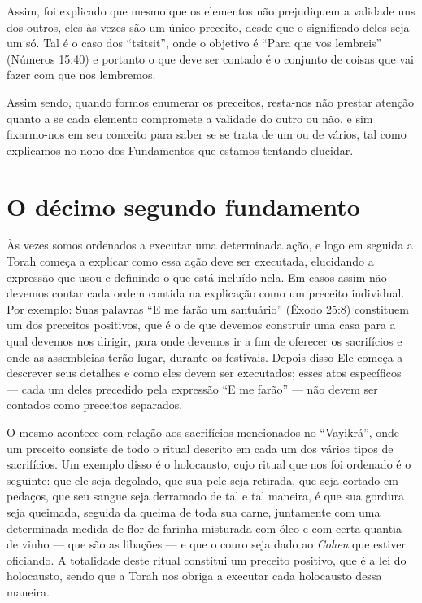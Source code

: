 Assim, foi explicado que mesmo que os elementos não prejudiquem a
validade uns dos outros, eles às vezes são um único preceito, desde que
o significado deles seja um só. Tal é o caso dos ``tsitsit'', onde o
objetivo é ``Para que vos lembreis'' (Números 15:40) e portanto o que
deve ser contado é o conjunto de coisas que vai fazer com que nos
lembremos.

Assim sendo, quando formos enumerar os preceitos, resta-nos não prestar
atenção quanto a se cada elemento compromete a validade do outro ou não,
e sim fixarmo-nos em seu conceito para saber se se trata de um ou de
vários, tal como explicamos no nono dos Fundamentos que estamos tentando
elucidar.



\chapter*{O décimo segundo fundamento}

Às vezes somos ordenados a executar uma determinada ação, e logo em
seguida a Torah começa a explicar como essa ação deve ser executada,
elucidando a expressão que usou e definindo o que está incluído nela. Em
casos assim não devemos contar cada ordem contida na explicação como um
preceito individual. Por exemplo: Suas palavras ``E me farão um
santuário'' (Êxodo 25:8) constituem um dos preceitos positivos, que é o
de que devemos construir uma casa para a qual devemos nos dirigir, para
onde devemos ir a fim de oferecer os sacrifícios e onde as assembleias
terão lugar, durante os festivais. Depois disso Ele começa a descrever
seus detalhes e como eles devem ser executados; esses atos específicos
--- cada um deles precedido pela expressão ``E me farão'' --- não devem
ser contados como preceitos separados.

O mesmo acontece com relação aos sacrifícios mencionados no
``Vayikrá'', onde um preceito consiste de todo o ritual descrito em
cada um dos vários tipos de sacrifícios. Um exemplo disso é o
holocausto, cujo ritual que nos foi ordenado é o seguinte: que ele seja
degolado, que sua pele seja retirada, que seja cortado em pedaços, que
seu sangue seja derramado de tal e tal maneira, é que sua gordura seja
queimada, seguida da queima de toda sua carne, juntamente com uma
determinada medida de flor de farinha misturada com óleo e com certa
quantia de vinho --- que são as libações --- e que o couro seja dado ao
\textit{Cohen} que estiver oficiando. A totalidade deste ritual constitui um
preceito positivo, que é a lei do holocausto, sendo que a Torah nos
obriga a executar cada holocausto dessa maneira.

